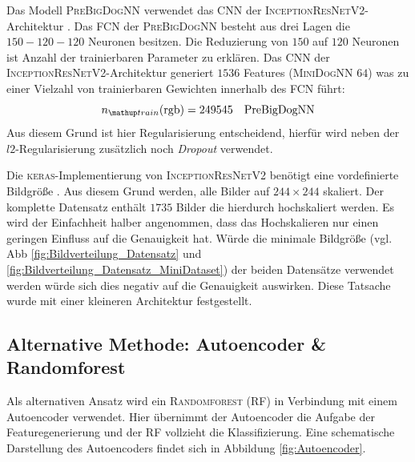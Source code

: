 Das Modell \textsc{PreBigDogNN} verwendet das CNN der
\textsc{InceptionResNetV2}-Architektur \cite{InceptionResNetV2}.
Das FCN der \textsc{PreBigDogNN} besteht aus drei Lagen die $150-120-120$
Neuronen besitzen. Die Reduzierung von
$150$ auf $120$ Neuronen ist Anzahl der trainierbaren Parameter zu erklären.
Das CNN der \textsc{InceptionResNetV2}-Architektur generiert
$1536$ Features (\textsc{MiniDogNN} $64$) was zu einer Vielzahl von
trainierbaren Gewichten innerhalb des FCN führt:
\begin{equation}
  \label{eq:ntrain_PreDogNN_PreBigDogNN}
  n\ua{train}(\mathrm{rgb}) = 249545 \quad \mathrm{PreBigDogNN}
\end{equation}
Aus diesem Grund ist hier Regularisierung entscheidend, hierfür wird neben der
$l2$-Regularisierung zusätzlich noch \emph{Dropout} verwendet.

Die \textsc{keras}-Implementierung von \textsc{InceptionResNetV2} benötigt
eine vordefinierte Bildgröße \cite{keras_InceptionResNetV2}.
Aus diesem Grund werden, alle Bilder auf $244\times 244$ skaliert.
Der komplette Datensatz enthält $1735$ Bilder die hierdurch hochskaliert werden.
Es wird der Einfachheit halber angenommen, dass das Hochskalieren nur einen
geringen Einfluss auf die Genauigkeit hat. Würde die minimale
Bildgröße (vgl. Abb \ref{fig:Bildverteilung_Datensatz} und
 \ref{fig:Bildverteilung_Datensatz_MiniDataset})
der beiden Datensätze verwendet werden
würde sich dies negativ auf die Genauigkeit auswirken. Diese Tatsache
wurde mit einer kleineren Architektur festgestellt.

\subsection{Alternative Methode: Autoencoder \& Randomforest}
Als alternativen Ansatz wird ein \textsc{Randomforest} (RF)
in Verbindung mit einem Autoencoder verwendet. Hier übernimmt der Autoencoder
die Aufgabe der Featuregenerierung und der RF vollzieht die Klassifizierung.
Eine schematische Darstellung des Autoencoders findet sich in Abbildung \ref{fig:Autoencoder}.

